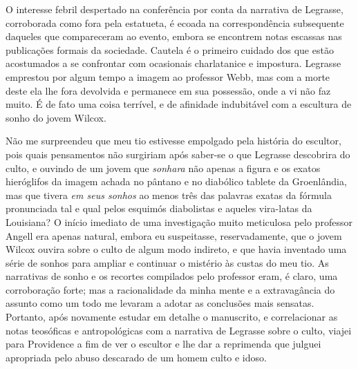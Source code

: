 O interesse febril despertado na conferência por conta da narrativa de
Legrasse, corroborada como fora pela estatueta, é ecoada na
correspondência subsequente daqueles que compareceram ao evento, embora
se encontrem notas escassas nas publicações formais da sociedade.
Cautela é o primeiro cuidado dos que estão acostumados a se confrontar
com ocasionais charlatanice e impostura. Legrasse emprestou por algum
tempo a imagem ao professor Webb, mas com a morte deste ela lhe fora
devolvida e permanece em sua possessão, onde a vi não faz muito. É de
fato uma coisa terrível, e de afinidade indubitável com a escultura de
sonho do jovem Wilcox.

Não me surpreendeu que meu tio estivesse empolgado pela história do
escultor, pois quais pensamentos não surgiriam após saber-se o que
Legrasse descobrira do culto, e ouvindo de um jovem que \emph{sonhara}
não apenas a figura e os exatos hieróglifos da imagem achada no pântano
e no diabólico tablete da Groenlândia, mas que tivera \emph{em seus
sonhos} ao menos três das palavras exatas da fórmula pronunciada tal e
qual pelos esquimós diabolistas e aqueles vira-latas da Louisiana? O
início imediato de uma investigação muito meticulosa pelo professor
Angell era apenas natural, embora eu suspeitasse, reservadamente,
que o jovem Wilcox ouvira sobre o culto de algum modo indireto, e que
havia inventado uma série de sonhos para ampliar e continuar o mistério
às custas do meu tio. As narrativas de sonho e os recortes compilados
pelo professor eram, é claro, uma corroboração forte; mas a
racionalidade da minha mente e a extravagância do assunto como um todo
me levaram a adotar as conclusões mais sensatas. Portanto, após
novamente estudar em detalhe o manuscrito, e correlacionar as notas
teosóficas e antropológicas com a narrativa de Legrasse sobre o culto,
viajei para Providence a fim de ver o escultor e lhe dar a reprimenda que
julguei apropriada pelo abuso descarado de um homem culto e idoso.

